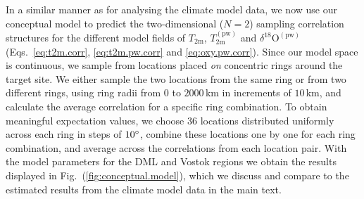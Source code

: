 \documentclass[cp, manuscript]{copernicus}
\begin{document}
In a similar manner as for analysing the climate model data, we now use our
conceptual model to predict the two-dimensional ($N=2$) sampling correlation
structures for the different model fields of $T_{\mathrm{2m}}$,
$T_{\mathrm{2m}}^{\mathrm{(pw)}}$ and $\delta^{18}\mathrm{O}^{\mathrm{(pw)}}$
(Eqs.~\ref{eq:t2m.corr}, \ref{eq:t2m.pw.corr} and \ref{eq:oxy.pw.corr}). Since
our model space is continuous, we sample from locations placed \emph{on}
concentric rings around the target site. We either sample the two locations from
the same ring or from two different rings, using ring radii from $0$ to
$2000$\,km in increments of $10$\,km, and calculate the average correlation for
a specific ring combination. To obtain meaningful expectation values, we choose
$36$ locations distributed uniformly across each ring in steps of $10^{\circ}$,
combine these locations one by one for each ring combination, and average across
the correlations from each location pair. With the model parameters for the DML
and Vostok regions we obtain the results displayed in
Fig.~(\ref{fig:conceptual.model}), which we discuss and compare to the estimated
results from the climate model data in the main text.

\noappendix





\end{document}
